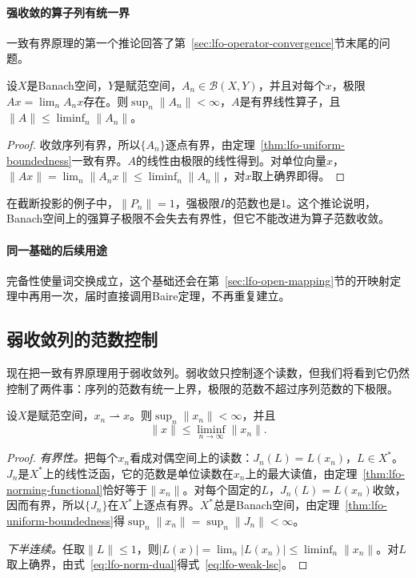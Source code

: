 \paragraph{强收敛的算子列有统一界}
一致有界原理的第一个推论回答了第~\ref{sec:lfo-operator-convergence}节末尾的问题。

\begin{theorem}
\label{thm:lfo-banach-steinhaus}
设$X$是Banach空间，$Y$是赋范空间，$A_n\in\mathcal B(X,Y)$，并且对每个$x$，极限$Ax=\lim_nA_nx$存在。则$\sup_n\|A_n\|<\infty$，$A$是有界线性算子，且$\|A\|\leq\liminf_n\|A_n\|$。
\end{theorem}

\begin{proof}
收敛序列有界，所以$\{A_n\}$逐点有界，由定理~\ref{thm:lfo-uniform-boundedness}一致有界。$A$的线性由极限的线性得到。对单位向量$x$，$\|Ax\|=\lim_n\|A_nx\|\leq\liminf_n\|A_n\|$，对$x$取上确界即得。
\end{proof}

在截断投影的例子中，$\|P_n\|=1$，强极限$I$的范数也是$1$。这个推论说明，Banach空间上的强算子极限不会失去有界性，但它不能改进为算子范数收敛。

\paragraph{同一基础的后续用途}
完备性使量词交换成立，这个基础还会在第~\ref{sec:lfo-open-mapping}节的开映射定理中再用一次，届时直接调用Baire定理，不再重复建立。

\subsection{弱收敛列的范数控制}
\label{sec:lfo-weak-norm}

现在把一致有界原理用于弱收敛列。弱收敛只控制逐个读数，但我们将看到它仍然控制了两件事：序列的范数有统一上界，极限的范数不超过序列范数的下极限。

\begin{theorem}[弱收敛列有界且范数下半连续]
\label{thm:lfo-weak-bounded}
设$X$是赋范空间，$x_n\rightharpoonup x$。则$\sup_n\|x_n\|<\infty$，并且
\begin{equation}
 \|x\|\leq\liminf_{n\to\infty}\|x_n\| .
 \label{eq:lfo-weak-lsc}
\end{equation}
\end{theorem}

\begin{proof}
\emph{有界性。}把每个$x_n$看成对偶空间上的读数：$J_n(L)=L(x_n)$，$L\in X^*$。$J_n$是$X^*$上的线性泛函，它的范数是单位读数在$x_n$上的最大读值，由定理~\ref{thm:lfo-norming-functional}恰好等于$\|x_n\|$。对每个固定的$L$，$J_n(L)=L(x_n)$收敛，因而有界，所以$\{J_n\}$在$X^*$上逐点有界。$X^*$总是Banach空间，由定理~\ref{thm:lfo-uniform-boundedness}得$\sup_n\|x_n\|=\sup_n\|J_n\|<\infty$。

\emph{下半连续。}任取$\|L\|\leq1$，则$|L(x)|=\lim_n|L(x_n)|\leq\liminf_n\|x_n\|$。对$L$取上确界，由式~\eqref{eq:lfo-norm-dual}得式~\eqref{eq:lfo-weak-lsc}。
\end{proof}

